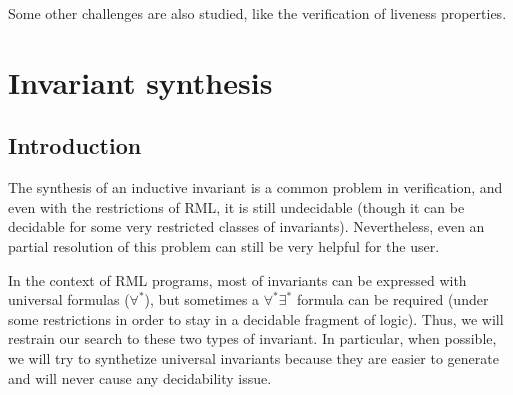 \documentclass[11pt,a4paper,oldfontcommands,openany]{memoir}
\begin{document}
    Some other challenges are also studied, like the verification of liveness properties\cite{Padon:2017:RLS:3177123.3158114}.


\chapter{Invariant synthesis}

    \section{Introduction}

    The synthesis of an inductive invariant is a common problem in verification, and even with the restrictions of RML, it is still undecidable (though it can be decidable for some very restricted classes of invariants)\cite{Padon:2016:DII:2914770.2837640}.
    Nevertheless, even an partial resolution of this problem can still be very helpful for the user.

    In the context of RML programs, most of invariants can be expressed with universal formulas (\(\forall^*\)), but sometimes a \(\forall^*\exists^*\) formula can be required (under some restrictions in order
    to stay in a decidable fragment of logic). Thus, we will restrain our search to these two types of invariant.
    In particular, when possible, we will try to synthetize universal invariants because they are easier to generate and will never cause any decidability issue.
    
\end{document}
